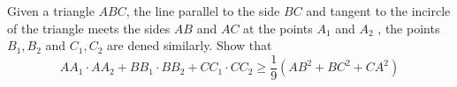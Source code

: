 Given a triangle $ABC$, the line parallel to the side $BC$ and tangent to the incircle of the triangle meets the sides $AB$ and $AC$ at the points $A_1$ and $A_2$ ,  the points $B_1, B_2$ and $C_1, C_2$ are dened similarly. Show that
$$AA_1 \cdot  AA_2 + BB_1 \cdot BB_2 + CC_1 \cdot CC_2  \ge \frac19 (AB^2 + BC^2 + CA^2)$$